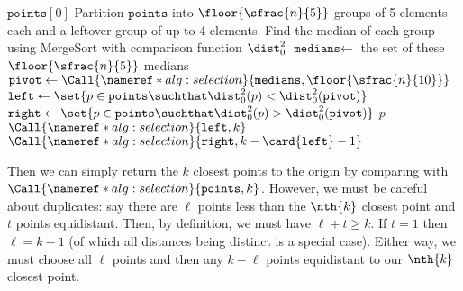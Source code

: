 \documentclass[draft]{article}
\begin{document}
\begin{algorithm}[H]
    \caption{}
    \label{alg:selection}
    \begin{algorithmic}[1]
        \State \Return $\texttt{points}[0]$
        \Else
        \State Partition $\texttt{points}$ into $\floor{\sfrac{n}{5}}$ groups of 5 elements each and a
        leftover group of up to 4 elements.
        \State Find the median of each group using MergeSort with comparison function $\dist_0^2$
        \State $\texttt{medians} \gets$ the set of these $\floor{\sfrac{n}{5}}$ medians
        \State $\texttt{pivot}\gets \Call{\nameref*{alg:selection}}{\texttt{medians},\floor{\sfrac{n}{10}}}$
        \State $\texttt{left} \gets \set{p\in \texttt{points} \suchthat \dist_0^2(p) < \dist_0^2(\texttt{pivot})}$
        \State $\texttt{right} \gets \set{p\in \texttt{points} \suchthat \dist_0^2(p) > \dist_0^2(\texttt{pivot})}$
        \State \Return $p$
        \State \Return $\Call{\nameref*{alg:selection}}{\texttt{left} ,k}$
        \Else
        \State \Return $\Call{\nameref*{alg:selection}}{\texttt{right},k-\card{\texttt{left}}-1}$
        \EndIf
        \EndIf
        \EndFunction
    \end{algorithmic}
\end{algorithm}
Then we can simply return the $k$ closest points to the origin by comparing with $\Call{\nameref*{alg:selection}}{\texttt{points},k}$. However, we must be careful about duplicates: say there are $\ell$ points less than the $\nth{k}$ closest point and $t$ points equidistant. Then, by definition, we must have $\ell + t \geq k$. If $t = 1$ then $\ell = k-1$ (of which all distances being distinct is a special case). Either way, we must choose all $\ell$ points and then any $k - \ell$ points equidistant to our $\nth{k}$ closest point.
\end{document}
